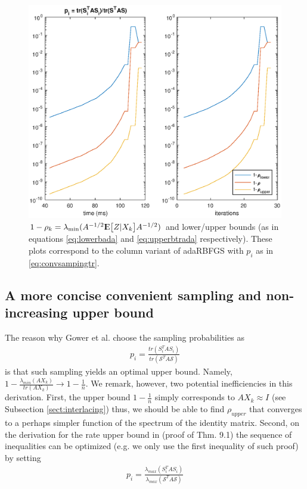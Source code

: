 \documentclass[12pt,conference,compsocconf]{IEEEtran}
\newcommand{\E}{{\rm I\kern-.3em E}}
\begin{document}
\begin{figure}[H]
  \centering
  \includegraphics[height=0.7\columnwidth,width=1.1\columnwidth]{ratetr.eps}
  
  \vspace{-2mm}
  \caption{$1-\rho_k=\lambda_{\text{min}}(A^{-1/2}\E\big[Z|X_k\big]A^{-1/2})$ and lower/upper bounds (as in equations \eqref{eq:lowerbada} and \eqref{eq:upperbtrada} respectively). These plots correspond to the column variant of adaRBFGS with $p_i$ as in \eqref{eq:convsampingtr}. \label{fig:ratetr}}
  
\end{figure}

\subsection{A more concise convenient sampling and non-increasing upper bound}\label{sect:convsampling}
The reason why Gower et al. choose the sampling probabilities as 
\begin{align}\label{eq:convsampingtr}
	p_i=\frac{tr(S_i^TAS_i)}{tr(\mathcal{S}^TA\mathcal{S})}
\end{align}
is that such sampling yields an optimal upper bound. Namely, $1-\frac{\lambda_{min}(AX_k)}{tr(AX_k)} \rightarrow 1-\frac{1}{n}$. We remark, however, two potential inefficiencies in this derivation. First, the upper bound $1-\frac{1}{n}$ simply corresponds to $AX_k\approx I$ (see Subsection \ref{sect:interlacing}) thus, we should be able to find $\rho_{upper}$ that converges to a perhaps simpler function of the spectrum of the identity matrix. Second, on the derivation for the rate upper bound in \cite{Gower1} (proof of Thm. 9.1) the sequence of inequalities can be optimized (e.g. we only use the first inequality of such proof) by setting
\begin{align}\label{eq:convsamplingmax}
	p_i=\frac{\lambda_{max}(S_i^TAS_i)}{\lambda_{max}(\mathcal{S}^TA\mathcal{S})}
\end{align}
\end{document}
